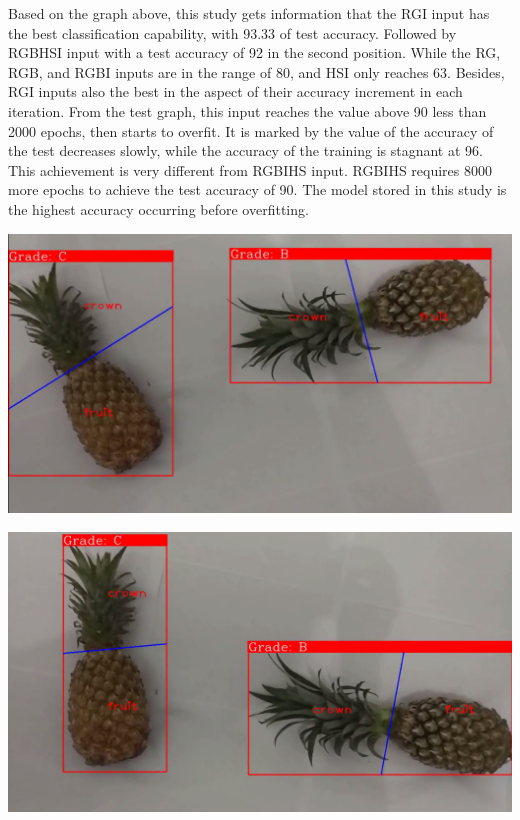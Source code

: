 \documentclass[11pt]{article}
\begin{document}
\begin{linenumbers}
Based on the graph above, this study gets information that the RGI input has the best classification capability, with 93.33\text{\%} of test accuracy. Followed by RGBHSI input with a test accuracy of 92\text{\%} in the second position. While the RG, RGB, and RGBI inputs are in the range of 80\text{\%}, and HSI only reaches 63\text{\%}. Besides, RGI inputs also the best in the aspect of their accuracy increment in each iteration. From the test graph, this input reaches the value above 90\text{\%} less than 2000 epochs, then starts to overfit. It is marked by the value of the accuracy of the test decreases slowly, while the accuracy of the training is stagnant at 96\text{\%}. This achievement is very different from RGBIHS input. RGBIHS requires 8000 more epochs to achieve the test accuracy of 90\text{\%}. The model stored in this study is the highest accuracy occurring before overfitting.


\begin{center}
	\includegraphics[scale=0.3]{images/final-result1}
\end{center}

\begin{center}
	\includegraphics[scale=0.3]{images/final-result2}
\end{center}


\end{linenumbers}
\end{document}
